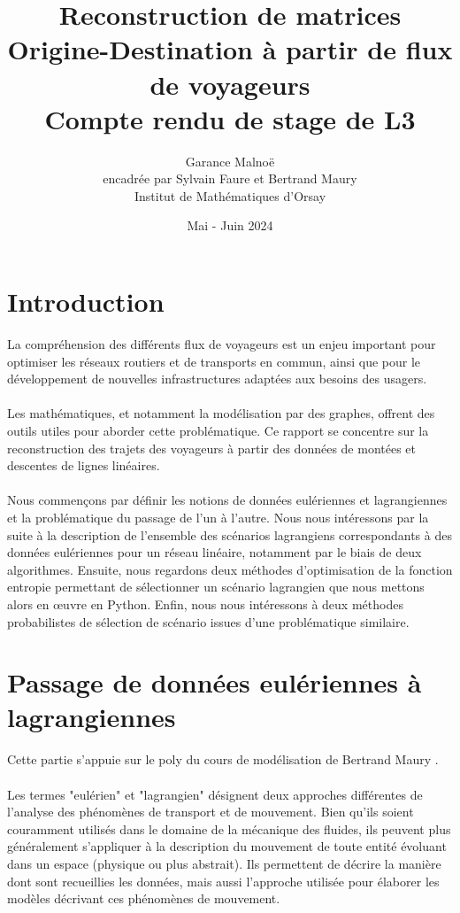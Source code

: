 \documentclass[12pt]{article}
\title{\textbf{Reconstruction de matrices Origine-Destination à partir de flux de voyageurs}\\
Compte rendu de stage de L3}
\author{Garance Malnoë\\
encadrée par Sylvain Faure et Bertrand Maury\\ \vspace{0.1cm}
Institut de Mathématiques d'Orsay}
\date{Mai - Juin 2024}
\begin{document}
\maketitle
\newpage
\tableofcontents
\newpage
\section{Introduction}
La compréhension des différents flux de voyageurs est un enjeu important pour optimiser les réseaux routiers et de transports en commun, ainsi que pour le développement de nouvelles infrastructures adaptées aux besoins des usagers.\\
\\
Les mathématiques, et notamment la modélisation par des graphes, offrent des outils utiles pour aborder cette problématique. Ce rapport se concentre sur la reconstruction des trajets des voyageurs à partir des données de montées et descentes de lignes linéaires.\\
\\
Nous commençons par définir les notions de données eulériennes et lagrangiennes et la problématique du passage de l'un à l'autre. Nous nous intéressons par la suite à la description de l'ensemble des scénarios lagrangiens correspondants à des données eulériennes pour un réseau linéaire, notamment par le biais de deux algorithmes. Ensuite, nous regardons deux méthodes d'optimisation de la fonction entropie permettant de sélectionner un scénario lagrangien que nous mettons alors en œuvre en Python. Enfin, nous nous intéressons à deux méthodes probabilistes de sélection de scénario issues d'une problématique similaire.\\
\section{Passage de données eulériennes à lagrangiennes}
Cette partie s'appuie sur le poly du cours de modélisation de Bertrand Maury \cite{poly_bertrand_maury}.\\
\\
Les termes "eulérien" et "lagrangien" désignent deux approches différentes de l'analyse des phénomènes de transport et de mouvement. Bien qu'ils soient couramment utilisés dans le domaine de la mécanique des fluides, ils peuvent plus généralement s'appliquer à la description du mouvement de toute entité évoluant dans un espace (physique ou plus abstrait). Ils permettent de décrire la manière dont sont recueillies les données, mais aussi l'approche utilisée pour élaborer les modèles décrivant ces phénomènes de mouvement.
\end{document}
